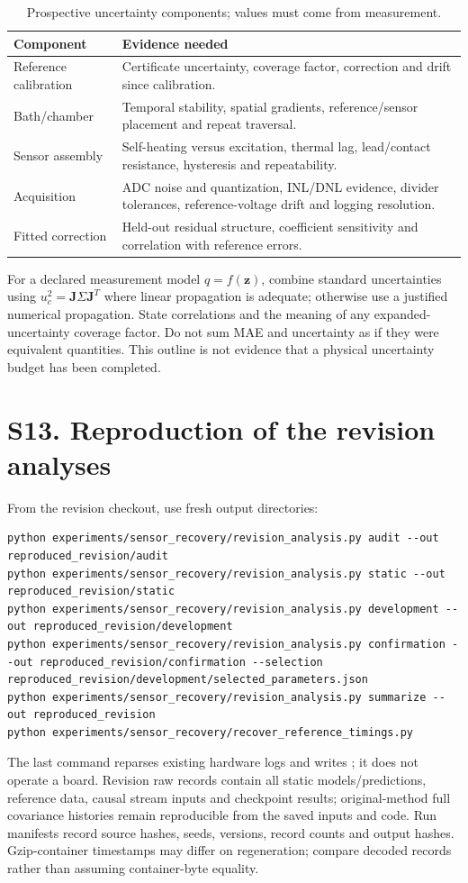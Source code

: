 \documentclass[10pt,letterpaper]{article}
\begin{document}
\begin{table}[!ht]
\centering\caption{Prospective uncertainty components; values must come from measurement.}
\small\begin{tabular}{p{}p{}}\toprule
Component & Evidence needed\\\midrule
Reference calibration & Certificate uncertainty, coverage factor, correction and drift since calibration.\\
Bath/chamber & Temporal stability, spatial gradients, reference/sensor placement and repeat traversal.\\
Sensor assembly & Self-heating versus excitation, thermal lag, lead/contact resistance, hysteresis and repeatability.\\
Acquisition & ADC noise and quantization, INL/DNL evidence, divider tolerances, reference-voltage drift and logging resolution.\\
Fitted correction & Held-out residual structure, coefficient sensitivity and correlation with reference errors.\\\bottomrule
\end{tabular}
\end{table}
For a declared measurement model $q=f(\boldsymbol z)$, combine standard uncertainties using $u_c^2=\boldsymbol J\Sigma\boldsymbol J^T$ where linear propagation is adequate; otherwise use a justified numerical propagation. State correlations and the meaning of any expanded-uncertainty coverage factor. Do not sum MAE and uncertainty as if they were equivalent quantities. This outline is not evidence that a physical uncertainty budget has been completed.

\section*{S13. Reproduction of the revision analyses}
From the revision checkout, use fresh output directories:
\begin{lstlisting}
python experiments/sensor_recovery/revision_analysis.py audit --out reproduced_revision/audit
python experiments/sensor_recovery/revision_analysis.py static --out reproduced_revision/static
python experiments/sensor_recovery/revision_analysis.py development --out reproduced_revision/development
python experiments/sensor_recovery/revision_analysis.py confirmation --out reproduced_revision/confirmation --selection reproduced_revision/development/selected_parameters.json
python experiments/sensor_recovery/revision_analysis.py summarize --out reproduced_revision
python experiments/sensor_recovery/recover_reference_timings.py
\end{lstlisting}
The last command reparses existing hardware logs and writes ; it does not operate a board. Revision raw records contain all static models/predictions, reference data, causal stream inputs and checkpoint results; original-method full covariance histories remain reproducible from the saved inputs and code. Run manifests record source hashes, seeds, versions, record counts and output hashes. Gzip-container timestamps may differ on regeneration; compare decoded records rather than assuming container-byte equality.
\end{document}
